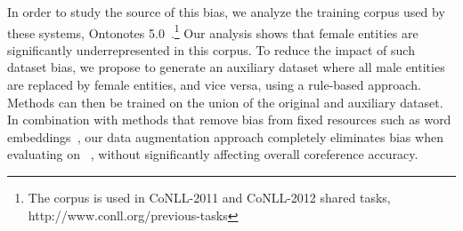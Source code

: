 In order to study the source of this bias, we analyze the training corpus used by these systems, Ontonotes 5.0~\cite{weischedel2012ontonotes}.\footnote{The corpus is used in CoNLL-2011 and CoNLL-2012 shared tasks, http://www.conll.org/previous-tasks} Our analysis shows that female entities are significantly underrepresented in this corpus. %
To reduce the impact of such dataset bias, we propose to generate an auxiliary dataset where all male entities are replaced by female entities, and vice versa, using a rule-based approach.
Methods can then be trained on the union of the original and auxiliary dataset.
In combination with methods that remove bias from fixed resources such as word embeddings~\cite{BCWS16}, our data augmentation approach completely eliminates bias when evaluating on \dataset~, without significantly affecting overall coreference accuracy. 










